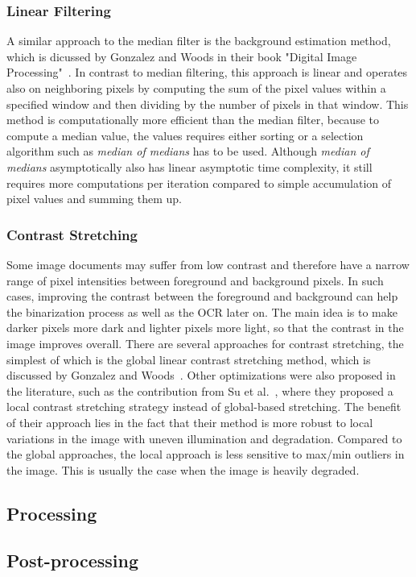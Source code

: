 \subsubsection{Linear Filtering}

A similar approach to the median filter is the background estimation method, which is dicussed by Gonzalez and Woods in their book "Digital Image Processing"~\cite{gonzalez2008digital}. In contrast to median filtering, this approach is linear and operates also on neighboring pixels by computing the sum of the pixel values within a specified window and then dividing by the number of pixels in that window. This method is computationally more efficient than the median filter, because to compute a median value, the values requires either sorting or a selection algorithm such as \textit{median of medians} has to be used. Although \textit{median of medians} asymptotically also has linear asymptotic time complexity, it still requires more computations per iteration compared to simple accumulation of pixel values and summing them up. 

\subsubsection{Contrast Stretching}

Some image documents may suffer from low contrast and therefore have a narrow range of pixel intensities between foreground and background pixels. In such cases, improving the contrast between the foreground and background can help the binarization process as well as the OCR later on. The main idea is to make darker pixels more dark and lighter pixels more light, so that the contrast in the image improves overall. There are several approaches for contrast stretching, the simplest of which is the global linear contrast stretching method, which is discussed by Gonzalez and Woods~\cite{gonzalez2008digital}. Other optimizations were also proposed in the literature, such as the contribution from Su et al.~\cite{6373726}, where they proposed a local contrast stretching strategy instead of global-based stretching. The benefit of their approach lies in the fact that their method is more robust to local variations in the image with uneven illumination and degradation. Compared to the global approaches, the local approach is less sensitive to max/min outliers in the image. This is usually the case when the image is heavily degraded.

\subsection{Processing}



\subsection{Post-processing}

